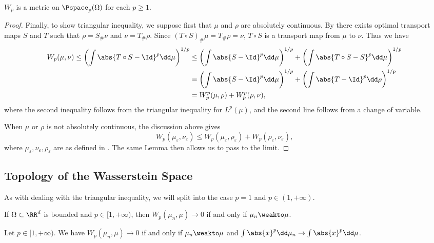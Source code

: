 \documentclass[oneside,reqno,letterpaper]{amsart}
\begin{document}
\begin{theorem}
  \(W_p\) is a metric on \(\Pspace_p(\Omega)\) for each \(p \geq 1\).
\end{theorem}
\begin{proof}
  Finally, to show triangular inequality, we suppose first that \(\mu\) and \(\rho\) are absolutely continuous.
  By  there exists optimal transport maps \(S\) and \(T\) such that \(\rho = S_{\#} \nu\) and \(\nu = T_{\#} \rho\).
  Since \((T \circ S)_{\#} \mu = T_{\#} \rho = \nu\), \(T \circ S\) is a transport map from \(\mu\) to \(\nu\).
  Thus we have
  \begin{align*}
    W_p(\mu, \nu)
    \leq \left( \int \abs{T \circ S - \Id}^p \dd \mu \right)^{1 / p}
    &\leq \left( \int \abs{S - \Id}^p \dd \mu \right)^{1 / p} + \left( \int \abs{T \circ S - S}^p \dd \mu \right)^{1 / p} \\
    &= \left( \int \abs{S - \Id}^p \dd \mu \right)^{1 / p} + \left( \int \abs{T - \Id}^p \dd \rho \right)^{1 / p} \\
    &= W_p^p(\mu, \rho) + W_p^p(\rho, \nu),
  \end{align*}
  where the second inequality follows from the triangular inequality for \(L^p(\mu)\), and the second line follows from a change of variable.

  When \(\mu\) or \(\rho\) is not absolutely continuous, the discussion above gives
  \[
    W_p(\mu_{\varepsilon}, \nu_{\varepsilon})
    \leq W_p(\mu_{\varepsilon}, \rho_{\varepsilon}) + W_p(\rho_{\varepsilon}, \nu_{\varepsilon}),
  \]
  where \(\mu_{\varepsilon}, \nu_{\varepsilon}, \rho_{\varepsilon}\) are as defined in .
  The same Lemma then allows us to pass to the limit.
\end{proof}


\subsection{Topology of the Wasserstein Space}
As with dealing with the triangular inequality, we will split into the case \(p = 1\) and \(p \in (1, +\infty)\).

\begin{theorem}
  If \(\Omega \subset \RR^d\) is bounded and \(p \in [1, +\infty)\), then \(W_p(\mu_n, \mu) \to 0\) if and only if \(\mu_n \weakto \mu\).
\end{theorem}


\begin{theorem}
  Let \(p \in [1, +\infty)\).
  We have \(W_p(\mu_n, \mu) \to 0\) if and only if \(\mu_n \weakto \mu\) and \(\int \abs{x}^p \dd \mu_n \to \int \abs{x}^p \dd \mu\).
\end{theorem}
\end{document}
